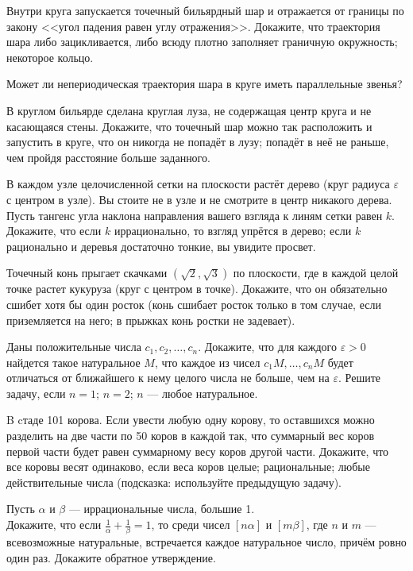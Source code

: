 \documentclass[a4paper,12pt]{article}
\begin{document}
 Внутри круга запускается точечный бильярдный шар и отражается от границы по закону <<угол падения равен углу отражения>>. Докажите, что траектория шара либо зацикливается, либо всюду плотно заполняет  граничную окружность;  некоторое кольцо.

 Может ли непериодическая траектория  шара в круге иметь параллельные звенья?

В круглом бильярде сделана круглая луза, не содержащая центр круга и не касающаяся стены. Докажите, что точечный шар можно так расположить и запустить в круге, что он  никогда не попадёт в лузу;  попадёт в неё не раньше, чем пройдя расстояние больше заданного.

 В каждом узле целочисленной сетки на плоскости растёт дерево (круг радиуса $\varepsilon$ с центром в узле). Вы стоите не в узле и не смотрите в центр никакого дерева. Пусть тангенс угла наклона направления вашего взгляда к линям сетки равен $k$. Докажите, что
 если $k$ иррационально, то взгляд упрётся в дерево;
 если $k$ рационально и деревья достаточно тонкие, вы увидите просвет.

 Точечный конь прыгает скачками $(\sqrt 2, \sqrt 3)$ по плоскости, где
в каждой целой точке растет кукуруза (круг с центром в точке). Докажите, что он
обязательно сшибет хотя бы один росток (конь сшибает росток только в
том случае, если приземляется на него; в прыжках конь ростки не
задевает).


Даны положительные числа $c_1, c_2,\ldots, c_n$.
Докажите, что для каждого $\varepsilon>0$ найдется такое натуральное $M$, что каждое из чисел $c_1M,\ldots,c_nM$ будет отличаться от ближайшего к нему целого числа не больше, чем на $\varepsilon$. Решите задачу, если
 $n=1$;  $n=2$;  $n$ --- любое натуральное.

B cтаде 101 корова. Если увести любую одну корову, то оставшихся можно
разделить на две части по 50 коров в каждой так, что суммарный вес коров
первой части будет равен суммарному весу коров другой части.
Докажите, что все коровы весят одинаково, если веса коров
 целые;
  рациональные;
 любые действительные числа (подсказка: используйте предыдущую задачу).

 Пусть $\alpha$ и $\beta$ --- иррациональные числа, большие 1.\\  Докажите, что если $\frac1\alpha+\frac1\beta=1$, то среди чисел $[n\alpha]$ и $[m\beta]$, где $n$ и $m$ --- всевозможные натуральные, встречается каждое натуральное число, причём ровно один раз.  Докажите обратное утверждение.



\end{document}
